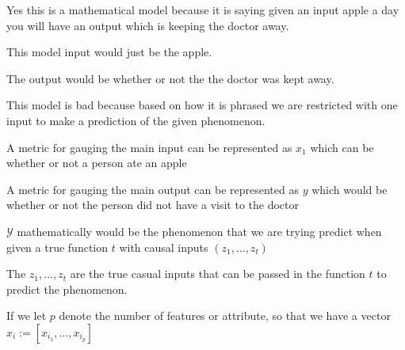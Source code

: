 \documentclass[12pt]{article}
\begin{document}
\begin{enumerate}



Yes this is a mathematical model because it is saying given an input apple a day you will have an output which is keeping the doctor away.


This model input would just be the apple.


The output would be whether or not the the doctor was kept away. 


This model is bad because based on how it is phrased we are restricted with one input to make a prediction of the given phenomenon.


A metric for gauging the main input can be represented as $x_1$ which can be whether or not a person ate an apple 


A metric for gauging the main output can be represented as $y$ which would be whether or not the person did not have a visit to the doctor


$\mathcal{Y}$ mathematically would be the phenomenon that we are trying predict when given a true function $t$ with causal inputs $(z_1, \ldots, z_t)$



The $z_1, \ldots, z_t$ are the true casual inputs that can be passed in the function $t$ to predict the phenomenon.


If we let $p$ denote the number of features or attribute, so that we have a vector $x_i := [x_i_1, \ldots, x_i_p]$ 



\end{enumerate}
\end{document}

